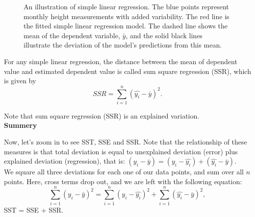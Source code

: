 \begin{figure}[H]
\begin{center}
\end{center}
\caption{An illustration of simple linear regression. The blue points represent monthly height measurements with added variability. The red line is the fitted simple linear regression model. The dashed line shows the mean of the dependent variable, $\bar{y}$, and the solid black lines illustrate the deviation of the model's predictions from this mean.}
\end{figure}

\begin{definition}
For any simple linear regression, the distance between the mean of dependent value and estimated dependent value is called sum square regression (SSR), which is given by $$SSR = \sum_{i=1}^{n}(\hat{y_i} - \bar{y})^2.$$
\end{definition}

Note that sum square regression (SSR) is an explained variation.\\

\textbf{Summery}

Now, let's zoom in to see SST, SSE and SSR. Note that the relationship of these measures is that total deviation is equal to unexplained deviation (error) plus explained deviation (regression), that is: $(y_i - \bar{y}) = (y_i - \hat{y_i}) + (\hat{y_i} - \bar{y})$.\\

We square all three deviations for each one of our data points, and sum over all $n$ points. Here, cross terms drop out, and we are left with the following equation: \[ \sum_{i=1}^{n}(y_i - \bar{y})^2 = \sum_{i=1}^{n} (y_i - \hat{y_i})^2 + \sum_{i=1}^{n}(\hat{y_i} - \bar{y})^2,\] SST = SSE + SSR.

